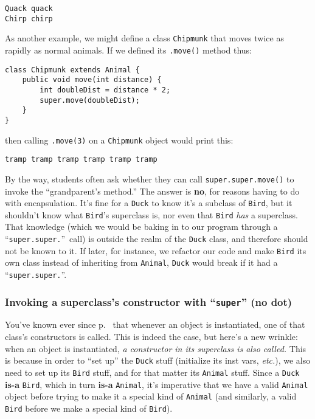 \pagebreak
\begin{Verbatim}[fontsize=\small,samepage=true,frame=none]
Quack quack
Chirp chirp
\end{Verbatim}

As another example, we might define a class \texttt{Chipmunk} that moves twice
as rapidly as normal animals. If we defined its \texttt{.move()} method thus:

\begin{Verbatim}[fontsize=\footnotesize,samepage=true,frame=single]
class Chipmunk extends Animal {
    public void move(int distance) {
        int doubleDist = distance * 2;
        super.move(doubleDist);
    }
}
\end{Verbatim}

then calling \texttt{.move(3)} on a \texttt{Chipmunk} object would print this:

\begin{Verbatim}[fontsize=\small,samepage=true,frame=none]
tramp tramp tramp tramp tramp tramp
\end{Verbatim}

By the way, students often ask whether they can call
\texttt{super.super.move()} to invoke the ``grandparent's method.'' The answer
is \textbf{no}, for reasons having to do with encapsulation. It's fine for a
\texttt{Duck} to know it's a subclass of \texttt{Bird}, but it shouldn't know
what \texttt{Bird}'s superclass is, nor even that \texttt{Bird} \textit{has} a
superclass. That knowledge (which we would be baking in to our program through
a ``\texttt{super.super.}''\ call) is outside the realm of the \texttt{Duck}
class, and therefore should not be known to it. If later, for instance, we
refactor our code and make \texttt{Bird} its own class instead of inheriting
from \texttt{Animal}, \texttt{Duck} would break if it had a
``\texttt{super.super.}''.

\subsubsection{Invoking a superclass's constructor with ``\texttt{super}'' (no
dot)}

You've known ever since p.~\pageref{page:instantiateConstructor} that whenever
an object is instantiated, one of that class's constructors is called. This is
indeed the case, but here's a new wrinkle: when an object is instantiated,
\textit{a constructor in its superclass is also called.} This is because in
order to ``set up'' the \texttt{Duck} stuff (initialize its inst vars,
\textit{etc.}), we also need to set up its \texttt{Bird} stuff, and for that
matter its \texttt{Animal} stuff. Since a \texttt{Duck} \textbf{is-a}
\texttt{Bird}, which in turn \textbf{is-a} \texttt{Animal}, it's imperative
that we have a valid \texttt{Animal} object before trying to make it a
special kind of \texttt{Animal} (and similarly, a valid \texttt{Bird} before
we make a special kind of \texttt{Bird}).

